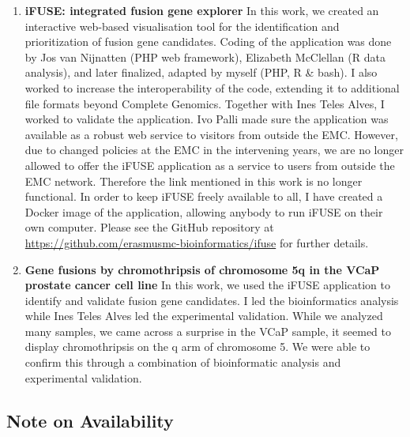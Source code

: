 \begin{enumerate}[label=\ref{chapter:fusiongenes}.\arabic*]
\itemsep-0.5em
\setcounter{enumi}{-1}
\item \textbf{iFUSE: integrated fusion gene explorer}
In this work, we created an interactive web-based visualisation tool for the identification and prioritization of fusion gene candidates. Coding of the application was done by Jos van Nijnatten (PHP web framework), Elizabeth McClellan (R data analysis), and later finalized, adapted by myself (PHP, R \& bash). I also worked to increase the interoperability of the code, extending it to additional file formats beyond Complete Genomics. Together with Ines Teles Alves, I worked to validate the application. Ivo Palli made sure the application was available as a robust web service to visitors from outside the EMC. However, due to changed policies at the EMC in the intervening years, we are no longer allowed to offer the iFUSE application as a service to users from outside the EMC network. Therefore the link mentioned in this work is no longer functional. In order to keep iFUSE freely available to all, I have created a Docker image of the application, allowing anybody to run iFUSE on their own computer. Please see the GitHub repository at \url{https://github.com/erasmusmc-bioinformatics/ifuse} for further details.

\item \textbf{Gene fusions by chromothripsis of chromosome 5q in the VCaP prostate cancer cell line}
In this work, we used the iFUSE application to identify and validate fusion gene candidates. I led the bioinformatics analysis while Ines Teles Alves led the experimental validation. While we analyzed many samples, we came across a surprise in the VCaP sample, it seemed to display chromothripsis on the q arm of chromosome 5. We were able to confirm this through a combination of bioinformatic analysis and experimental validation.


\end{enumerate}

\subsection{Note on Availability}

